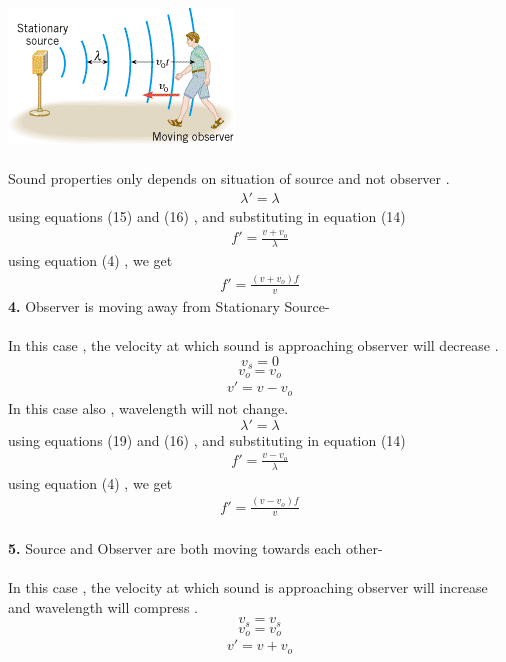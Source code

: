 \documentclass[journal,12pt,twocolumn]{IEEEtran}
\theoremstyle{remark}
\begin{document}
    \includegraphics[width=0.9\linewidth]{figs/wave3.png}\\\\
Sound properties only depends on situation of source and not observer .
\begin{align}\lambda' = \lambda\end{align}
using equations (15) and (16) , and substituting in equation (14) 
\begin{align}f' = \frac{v+v_o}{\lambda}\end{align}
using equation (4) , we get 
\begin{align}f' = \frac{(v+v_o) f}{v }\end{align}
\textbf{4.} Observer is moving away from Stationary Source-\\\\
In this case , the velocity at which sound is approaching observer will decrease .
$$v_s = 0$$
$$v_o = v_o$$
\begin{align}v'= v-v_o\end{align}
In this case also , wavelength will not change.
$$\lambda' = \lambda$$
using equations (19) and (16) , and substituting in equation (14) 
\begin{align}f' = \frac{v-v_o}{\lambda}\end{align}
using equation (4) , we get 
\begin{align}f' = \frac{(v-v_o) f}{v }\end{align}\\
\textbf{5.} Source and Observer are both moving towards each other-\\\\
In this case , the velocity at which sound is approaching observer will increase and wavelength will compress .
$$v_s = v_s$$
$$v_o = v_o$$
\begin{align}v'= v+v_o\end{align}
\end{document}
